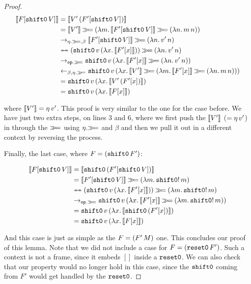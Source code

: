 \begin{proof}
\NoChapterPrefix
\begin{align}
  \sem{F[\ap{\shifto}{V}]}
  &= \sem{\ap{V'}{(F'[\ap{\shifto}{V}])}} \\
  &= \sem{V'} \hsbind (\lam{m}{\sem{F'[\ap{\shifto}{V}]} \hsbind (\lam{n}{\ap{m}{n}})}) \\
  &\to_{\eta.\hsbind,\beta} \sem{F'[\ap{\shifto}{V}]} \hsbind (\lam{n}{\ap{v'}{n}}) \\
  &\ttoffrom (\app{\op{shift0}}{v}{(\lam{x}{\sem{F'[x]}})}) \hsbind (\lam{n}{\ap{v'}{n}}) \\
  &\to_{\op{op}.\hsbind} \app{\op{shift0}}{v}{(\lam{x}{\sem{F'[x]} \hsbind (\lam{n}{\ap{v'}{n}})})}\\
  &\from_{\beta,\eta.\hsbind} \app{\op{shift0}}{v}{(\lam{x}{\sem{V'} \hsbind (\lam{m}{\sem{F'[x]} \hsbind (\lam{n}{\ap{m}{n}})})})}\\
  &= \app{\op{shift0}}{v}{(\lam{x}{\sem{\ap{V'}{(F'[x])}}})} \\
  &= \app{\op{shift0}}{v}{(\lam{x}{\sem{F[x]}})}
\end{align}
\setcounter{equation}{0}
\ChapterPrefix

where $\llbracket V' \rrbracket = \eta\,v'$. This proof is very similar to the one for
the case before. We have just two extra steps, on lines 3 and 6, where we
first push the $\llbracket V' \rrbracket$ ($= \eta\,v'$) in through the $\mathbin{\gg\!=}$
using $\eta.\mathbin{\gg\!=}$ and $\beta$ and then we pull it out in a different
context by reversing the process.

Finally, the last case, where $F = (\mathtt{shift0}\,F')$:

\NoChapterPrefix
\begin{align}
  \llbracket F[\mathtt{shift0}\,V] \rrbracket
  &= \llbracket \mathtt{shift0}\,(F'[\mathtt{shift0}\,V]) \rrbracket \\
  &= \llbracket F'[\mathtt{shift0}\,V] \rrbracket \mathbin{\gg\!=} (\lambda m.\, \mathtt{shift0}!\,m) \\
  &\twoheadleftarrow \mathrel{\mkern-15mu} \twoheadrightarrow (\mathtt{shift0}\,v\,(\lambda x.\, \llbracket F'[x] \rrbracket)) \mathbin{\gg\!=} (\lambda m.\, \mathtt{shift0}!\,m) \\
  &\to_{\mathtt{op}.\mathbin{\gg\!=}} \mathtt{shift0}\,v\,(\lambda x.\, \llbracket F'[x] \rrbracket \mathbin{\gg\!=} (\lambda m.\, \mathtt{shift0}!\,m)) \\
  &= \mathtt{shift0}\,v\,(\lambda x.\, \llbracket \mathtt{shift0}\,(F'[x]) \rrbracket) \\
  &= \mathtt{shift0}\,v\,(\lambda x.\, \llbracket F[x] \rrbracket)
\end{align}
\setcounter{equation}{0}
\ChapterPrefix

And this case is just as simple as the $F = (F'\,M)$ one. This
concludes our proof of this lemma. Note that we did not include a case for
$F = (\mathtt{reset0}\,F')$. Such a context is not a frame, since it embeds
$[]$ inside a $\mathtt{reset0}$. We can also check that our property would no
longer hold in this case, since the $\mathtt{shift0}$ coming from $F'$ would get
handled by the $\mathtt{reset0}$.
\end{proof}

